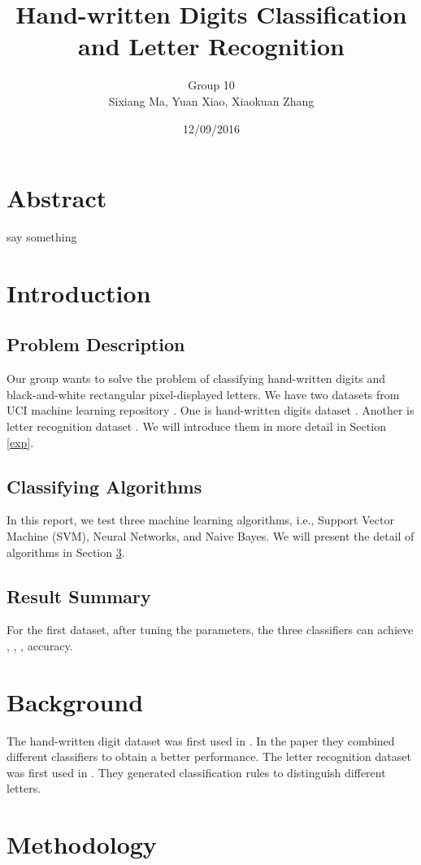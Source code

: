 \documentclass[11pt]{article}
\title{Hand-written Digits Classification and Letter Recognition}
\author{Group 10 \\ Sixiang Ma, Yuan Xiao, Xiaokuan Zhang}
\date{12/09/2016}
\begin{document}
\maketitle
\section*{Abstract}
say something

\section{Introduction}

\subsection{Problem Description}
Our group wants to solve the problem of classifying hand-written digits and  black-and-white rectangular pixel-displayed letters. We have two datasets from UCI machine learning repository \cite{Lichman2013}. One is hand-written digits dataset \cite{digitdataset}. Another is letter recognition dataset \cite{letterdataset}. We will introduce them in more detail in Section \ref{exp}.

\subsection{Classifying Algorithms}
In this report, we test three machine learning  algorithms, i.e., Support Vector Machine (SVM), Neural Networks, and Naive Bayes. We will present the detail of algorithms in Section \ref{sec:metho}.
\subsection{Result Summary}
For the first dataset, after tuning the parameters, the three classifiers can achieve , , , accuracy. 

\section{Background}
The hand-written digit dataset was first used in \cite{kaynak1995methods}. In the paper they combined different classifiers to obtain a better performance.  The letter recognition dataset was first used in \cite{frey1991letter}. They generated classification rules to distinguish different letters.

\section{Methodology}\label{sec:metho}
\end{document}
